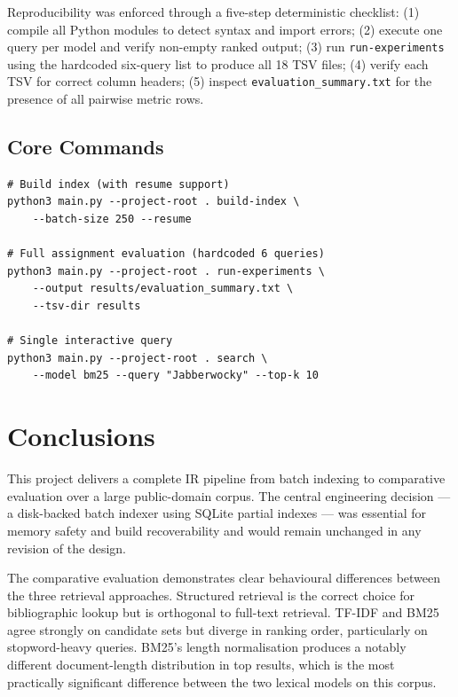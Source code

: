 \documentclass[sigconf]{acmart}
\begin{document}
Reproducibility was enforced through a five-step deterministic checklist: (1) compile all Python modules to detect syntax and import errors; (2) execute one query per model and verify non-empty ranked output; (3) run \texttt{run-experiments} using the hardcoded six-query list to produce all 18 TSV files; (4) verify each TSV for correct column headers; (5) inspect \texttt{evaluation\_summary.txt} for the presence of all pairwise metric rows.

\subsection{Core Commands}

\begin{lstlisting}
# Build index (with resume support)
python3 main.py --project-root . build-index \
    --batch-size 250 --resume

# Full assignment evaluation (hardcoded 6 queries)
python3 main.py --project-root . run-experiments \
    --output results/evaluation_summary.txt \
    --tsv-dir results

# Single interactive query
python3 main.py --project-root . search \
    --model bm25 --query "Jabberwocky" --top-k 10
\end{lstlisting}

\section{Conclusions}

This project delivers a complete IR pipeline from batch indexing to comparative evaluation over a large public-domain corpus. The central engineering decision --- a disk-backed batch indexer using SQLite partial indexes --- was essential for memory safety and build recoverability and would remain unchanged in any revision of the design.

The comparative evaluation demonstrates clear behavioural differences between the three retrieval approaches. Structured retrieval is the correct choice for bibliographic lookup but is orthogonal to full-text retrieval. TF-IDF and BM25 agree strongly on candidate sets but diverge in ranking order, particularly on stopword-heavy queries. BM25's length normalisation produces a notably different document-length distribution in top results, which is the most practically significant difference between the two lexical models on this corpus.
\end{document}
